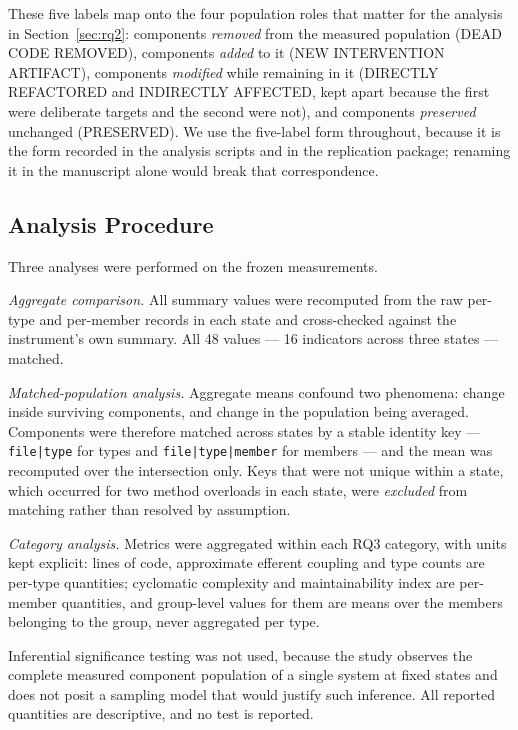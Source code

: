 \documentclass[pdflatex,sn-basic]{sn-jnl}
\begin{document}
These five labels map onto the four population roles that matter for the analysis in Section~\ref{sec:rq2}: components \emph{removed} from the measured population (DEAD CODE REMOVED), components \emph{added} to it (NEW INTERVENTION ARTIFACT), components \emph{modified} while remaining in it (DIRECTLY REFACTORED and INDIRECTLY AFFECTED, kept apart because the first were deliberate targets and the second were not), and components \emph{preserved} unchanged (PRESERVED). We use the five-label form throughout, because it is the form recorded in the analysis scripts and in the replication package; renaming it in the manuscript alone would break that correspondence.

\subsection{Analysis Procedure}

Three analyses were performed on the frozen measurements.

\emph{Aggregate comparison.} All summary values were recomputed from the raw per-type and per-member records in each state and cross-checked against the instrument's own summary. All 48 values --- 16 indicators across three states --- matched.

\emph{Matched-population analysis.} Aggregate means confound two phenomena: change inside surviving components, and change in the population being averaged. Components were therefore matched across states by a stable identity key --- \texttt{file|type} for types and \texttt{file|type|member} for members --- and the mean was recomputed over the intersection only. Keys that were not unique within a state, which occurred for two method overloads in each state, were \emph{excluded} from matching rather than resolved by assumption.

\emph{Category analysis.} Metrics were aggregated within each RQ3 category, with units kept explicit: lines of code, approximate efferent coupling and type counts are per-type quantities; cyclomatic complexity and maintainability index are per-member quantities, and group-level values for them are means over the members belonging to the group, never aggregated per type.

Inferential significance testing was not used, because the study observes the complete measured component population of a single system at fixed states and does not posit a sampling model that would justify such inference. All reported quantities are descriptive, and no test is reported.
\end{document}
